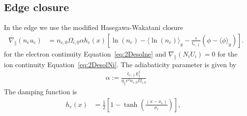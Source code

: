 \documentclass{hitec} %
\begin{document}
\subsection{Edge closure}\label{sec:edgeclosure}
In the edge we use the modified Hasegawa-Wakatani closure 
\begin{align}\label{eq:modhw}
\nabla_\parallel \left(n_e u_e\right) &= n_{e,0} \Omega_{i,0} \alpha  h_{e}(x)
\left[ \ln (n_e) - \langle  \ln (n_e)\rangle_y  - \frac{e}{t_{e,\parallel}} \left(\phi - \langle \phi\rangle_y\right)
\right].
\end{align}
for the electron continuity Equation~\eqref{eq:2Desolne} and \(\nabla_\parallel \left(N_i U_i\right) = 0\) for the ion continuity Equation~\eqref{eq:2DesolNi}.
The adiabaticity parameter is given by 
\begin{align}
 \alpha:= \frac{ t_{e,\parallel}  k_\parallel^2 }{ \eta_\parallel e^2   n_{e,0} \Omega_{i,0} }
\end{align}
The damping function is 
\begin{align}
 h_{e}(x) &=\frac{1}{2}\left[1- \tanh{\left(\frac{(x-x_e)}{\sigma_e}\right)}\right], & 
\end{align}
\end{document}
